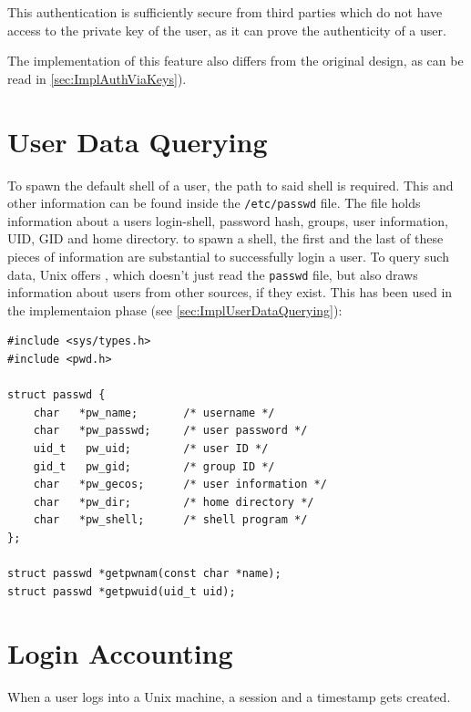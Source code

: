 \documentclass[10pt,a4paper,titlepage,twoside,english,final]{zhawreprt}
\begin{document}
This authentication is sufficiently secure from third parties which do not have access to the private key of the user, as it can prove the authenticity of a user.

The implementation of this feature also differs from the original design, as can be read in \ref{sec:ImplAuthViaKeys}).

\section{User Data Querying}\label{sec:DesignUserDataQuerying}
To spawn the default \gls{shell} of a user, the path to said \gls{shell} is required. This and other information can be found inside the \texttt{/etc/passwd} file. The file holds information about a users login-\gls{shell}, password hash, groups, user information, \gls{UID}, \gls{GID} and home directory. to spawn a \gls{shell}, the first and the last of these pieces of information are substantial to successfully login a user. To query such data, \gls{Unix} offers \cite{getpw}, which doesn't just read the \texttt{passwd} file, but also draws information about users from other sources, if they exist. This has been used in the implementaion phase (see \ref{sec:ImplUserDataQuerying}):
\setlistingC
\begin{lstlisting}[caption={Definition of passwd and {\cite{getpw}}},label=lst:PasswdDefinition]
#include <sys/types.h>
#include <pwd.h>

struct passwd {
	char   *pw_name;       /* username */
	char   *pw_passwd;     /* user password */
	uid_t   pw_uid;        /* user ID */
	gid_t   pw_gid;        /* group ID */
	char   *pw_gecos;      /* user information */
	char   *pw_dir;        /* home directory */
	char   *pw_shell;      /* shell program */
};

struct passwd *getpwnam(const char *name);
struct passwd *getpwuid(uid_t uid);
\end{lstlisting}

\section{Login Accounting}\label{sec:DesignLoginAccounting}
When a user logs into a \gls{Unix} machine, a session and a timestamp gets created.
\end{document}
